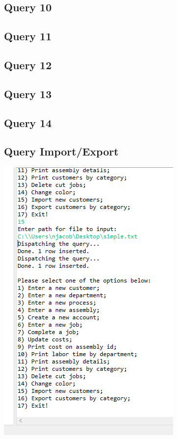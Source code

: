 \documentclass[11pt]{article}
\begin{document}
\subsection{Query 10}
\subsection{Query 11}
\subsection{Query 12}
\subsection{Query 13}
\subsection{Query 14}

\subsection{Query Import/Export}

\includegraphics[width = \textwidth]{insert.png}
\end{document}
